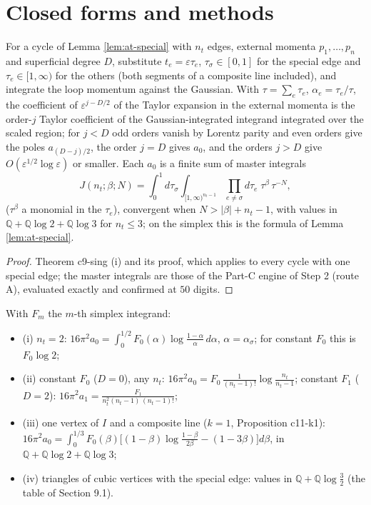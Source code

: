 
\section{Closed forms and methods}
\label{sec:at-closed}

\begin{proposition}
\label{prop:at-schwinger}
For a cycle of Lemma \ref{lem:at-special} with $n_t$ edges, external momenta $p_1,\dots,p_n$ and superficial degree $D$, substitute $t_e=\varepsilon\tau_e$, $\tau_\sigma\in[0,1]$ for the special edge and $\tau_e\in[1,\infty)$ for the others (both segments of a composite line included), and integrate the loop momentum against the Gaussian. With $\tau=\sum_e\tau_e$, $\alpha_e=\tau_e/\tau$, the coefficient of $\varepsilon^{j-D/2}$ of the Taylor expansion in the external momenta is the order-$j$ Taylor coefficient of the Gaussian-integrated integrand integrated over the scaled region; for $j<D$ odd orders vanish by Lorentz parity and even orders give the poles $a_{(D-j)/2}$, the order $j=D$ gives $a_0$, and the orders $j>D$ give $O(\varepsilon^{1/2}\log\varepsilon)$ or smaller. Each $a_0$ is a finite sum of master integrals
\[
J(n_t;\beta;N)=\int_0^1d\tau_\sigma\int_{[1,\infty)^{n_t-1}}\prod_{e\ne\sigma}d\tau_e\;\tau^\beta\,\tau^{-N},
\]
($\tau^\beta$ a monomial in the $\tau_e$), convergent when $N>|\beta|+n_t-1$, with values in $\mathbb Q+\mathbb Q\log2+\mathbb Q\log3$ for $n_t\le3$; on the simplex this is the formula of Lemma \ref{lem:at-special}.
\end{proposition}

\begin{proof}
Theorem c9-sing (i) and its proof, which applies to every cycle with one special edge; the master integrals are those of the Part-C engine of Step 2 (route A), evaluated exactly and confirmed at $50$ digits.
\end{proof}

\begin{proposition}
\label{prop:at-small}
With $F_m$ the $m$-th simplex integrand:
\begin{itemize}
\item (i) $n_t=2$: $16\pi^2a_0=\int_0^{1/2}F_0(\alpha)\log\frac{1-\alpha}\alpha\,d\alpha$, $\alpha=\alpha_\sigma$; for constant $F_0$ this is $F_0\log2$;
\item (ii) constant $F_0$ ($D=0$), any $n_t$: $16\pi^2a_0=F_0\,\frac{1}{(n_t-1)!}\log\frac{n_t}{n_t-1}$; constant $F_1$ ($D=2$): $16\pi^2a_1=\frac{F_1}{n_t^2(n_t-1)\,(n_t-1)!}$;
\item (iii) one vertex of $I$ and a composite line ($k=1$, Proposition c11-k1): $16\pi^2a_0=\int_0^{1/3}F_0(\beta)\big[(1-\beta)\log\frac{1-\beta}{2\beta}-(1-3\beta)\big]d\beta$, in $\mathbb Q+\mathbb Q\log2+\mathbb Q\log3$;
\item (iv) triangles of cubic vertices with the special edge: values in $\mathbb Q+\mathbb Q\log\tfrac32$ (the table of Section 9.1).
\end{itemize}
\end{proposition}

